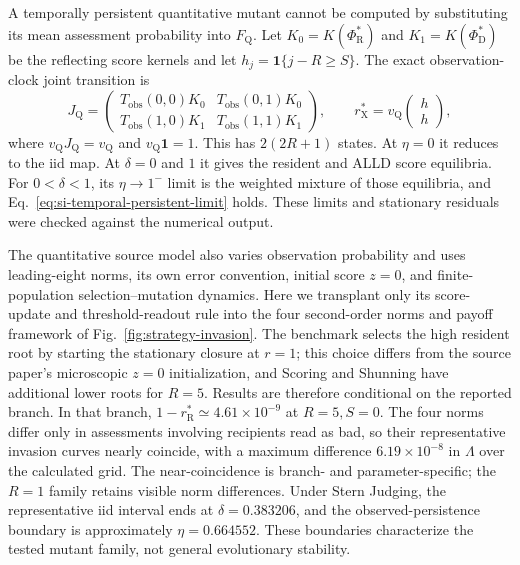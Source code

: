 \documentclass[fleqn,10pt]{wlscirep}
\begin{document}
A temporally persistent quantitative mutant cannot be computed by substituting its mean assessment probability into $F_{\mathrm Q}$. Let $K_0=K(\Phi_{\mathrm R}^*)$ and $K_1=K(\Phi_{\mathrm D}^*)$ be the reflecting score kernels and let $h_j=\mathbf1\{j-R\geq S\}$. The exact observation-clock joint transition is
\begin{equation}
J_{\mathrm Q}=\begin{pmatrix}
T_{\mathrm{obs}}(0,0)K_0&T_{\mathrm{obs}}(0,1)K_0\\
T_{\mathrm{obs}}(1,0)K_1&T_{\mathrm{obs}}(1,1)K_1
\end{pmatrix},
\qquad
r_{\mathrm X}^*=v_{\mathrm Q}\begin{pmatrix}h\\h\end{pmatrix},
\label{eq:si-quantitative-joint}
\end{equation}
where $v_{\mathrm Q}J_{\mathrm Q}=v_{\mathrm Q}$ and $v_{\mathrm Q}\mathbf1=1$. This has $2(2R+1)$ states. At $\eta=0$ it reduces to the iid map. At $\delta=0$ and $1$ it gives the resident and ALLD score equilibria. For $0<\delta<1$, its $\eta\to1^{-}$ limit is the weighted mixture of those equilibria, and Eq.~\eqref{eq:si-temporal-persistent-limit} holds. These limits and stationary residuals were checked against the numerical output.

The quantitative source model also varies observation probability and uses leading-eight norms, its own error convention, initial score $z=0$, and finite-population selection--mutation dynamics. Here we transplant only its score-update and threshold-readout rule into the four second-order norms and payoff framework of Fig.~\ref{fig:strategy-invasion}. The benchmark selects the high resident root by starting the stationary closure at $r=1$; this choice differs from the source paper's microscopic $z=0$ initialization, and Scoring and Shunning have additional lower roots for $R=5$. Results are therefore conditional on the reported branch. In that branch, $1-r_{\mathrm R}^*\simeq4.61\times10^{-9}$ at $R=5,S=0$. The four norms differ only in assessments involving recipients read as bad, so their representative invasion curves nearly coincide, with a maximum difference $6.19\times10^{-8}$ in $\Lambda$ over the calculated grid. The near-coincidence is branch- and parameter-specific; the $R=1$ family retains visible norm differences. Under Stern Judging, the representative iid interval ends at $\delta=0.383206$, and the observed-persistence boundary is approximately $\eta=0.664552$. These boundaries characterize the tested mutant family, not general evolutionary stability.
\end{document}
